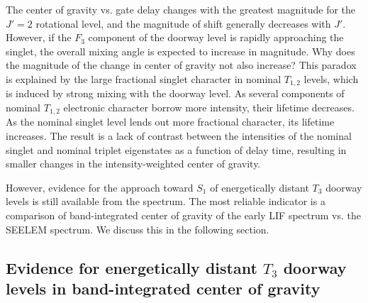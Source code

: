 \documentclass[12pt]{mitthesis}
\begin{document}
The center of gravity vs. gate delay changes with the greatest
magnitude for the $J'=2$ rotational level, and the magnitude of shift
generally decreases with $J'$.  However, if the $F_3$ component of the
doorway level is rapidly approaching the singlet, the overall mixing
angle is expected to increase in magnitude.  Why does the magnitude of
the change in center of gravity not also increase?  This paradox is
explained by the large fractional singlet character in nominal
$T_{1,2}$ levels, which is induced by strong mixing with the doorway
level.  As several components of nominal $T_{1,2}$ electronic
character borrow more intensity, their lifetime decreases.  As the
nominal singlet level lends out more fractional character, its
lifetime increases.  The result is a lack of contrast between the
intensities of the nominal singlet and nominal triplet eigenstates as
a function of delay time, resulting in smaller changes in the
intensity-weighted center of gravity.

However, evidence for the approach toward $S_1$ of energetically
distant $T_3$ doorway levels is still available from the spectrum.
The most reliable indicator is a comparison of band-integrated center
of gravity of the early LIF spectrum vs. the SEELEM spectrum.  We
discuss this in the following section.

\subsection{Evidence for energetically distant $T_3$ doorway levels in
  band-integrated center of gravity}

\end{document}
